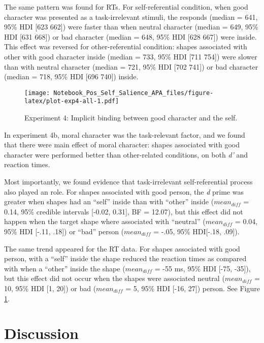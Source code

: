 \documentclass[
  man]{apa6}
\begin{document}
The same pattern was found for RTs. For self-referential condition, when good character was presented as a task-irrelevant stimuli, the responds (median = 641, 95\% HDI {[}623 662{]}) were faster than when neutral character (median = 649, 95\% HDI {[}631 668{]}) or bad character (median = 648, 95\% HDI {[}628 667{]}) were inside. This effect was reversed for other-referential condition: shapes associated with other with good character inside (median = 733, 95\% HDI {[}711 754{]}) were slower than with neutral character (median = 721, 95\% HDI {[}702 741{]}) or bad character (median = 718, 95\% HDI {[}696 740{]}) inside.

\begin{figure}
\centering
\texttt{[image: Notebook\_Pos\_Self\_Salience\_APA\_files/figure-latex/plot-exp4-all-1.pdf]}
\caption{\label{fig:plot-exp4-all}Experiment 4: Implicit binding between good character and the self.}
\end{figure}

In experiment 4b, moral character was the task-relevant factor, and we found that there were main effect of moral character: shapes associated with good character were performed better than other-related conditions, on both \emph{d'} and reaction times.

Most importantly, we found evidence that task-irrelevant self-referential process also played an role. For shapes associated with good person, the \emph{d} prime was greater when shapes had an ``self'' inside than with ``other'' inside (\(mean_{diff}\) = 0.14, 95\% credible intervals {[}-0.02, 0.31{]}, BF = 12.07), but this effect did not happen when the target shape where associated with ``neutral'' (\(mean_{diff}\) = 0.04, 95\% HDI {[}-.11, .18{]}) or ``bad'' person (\(mean_{diff}\) = -.05, 95\% HDI{[}-.18, .09{]}).

The same trend appeared for the RT data. For shapes associated with good person, with a ``self'' inside the shape reduced the reaction times as compared with when a ``other'' inside the shape (\(mean_{diff}\) = -55 ms, 95\% HDI {[}-75, -35{]}), but this effect did not occur when the shapes were associated neutral (\(mean_{diff}\) = 10, 95\% HDI {[}1, 20{]}) or bad (\(mean_{diff}\) = 5, 95\% HDI {[}-16, 27{]}) person. See Figure \ref{fig:plot-exp4-all}.

\hypertarget{discussion}{%
\section{Discussion}\label{discussion}}
\end{document}
